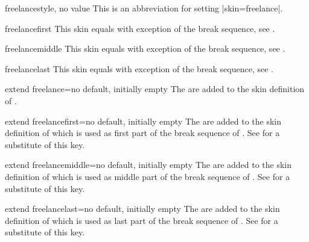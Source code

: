\begin{docTcbKey}{freelance}{}{style, no value}
  This is an abbreviation for setting |skin=freelance|.
\end{docTcbKey}

\begin{docSkin}{freelancefirst}
  This skin equals  with exception of the break sequence,
  see .
\end{docSkin}

\begin{docSkin}{freelancemiddle}
  This skin equals  with exception of the break sequence,
  see .
\end{docSkin}

\begin{docSkin}{freelancelast}
  This skin equals  with exception of the break sequence,
  see .
\end{docSkin}


\begin{docTcbKey}{extend freelance}{=}{no default, initially empty}
The  are added to the skin definition of .
\end{docTcbKey}

\begin{docTcbKey}{extend freelancefirst}{=}{no default, initially empty}
The  are added to the skin definition of  which
is used as first part of the break sequence of .
See  for a substitute of this key.
\end{docTcbKey}

\begin{docTcbKey}{extend freelancemiddle}{=}{no default, initially empty}
The  are added to the skin definition of  which
is used as middle part of the break sequence of .
See  for a substitute of this key.
\end{docTcbKey}

\enlargethispage*{1cm}

\begin{docTcbKey}{extend freelancelast}{=}{no default, initially empty}
The  are added to the skin definition of  which
is used as last part of the break sequence of .
See  for a substitute of this key.
\end{docTcbKey}



